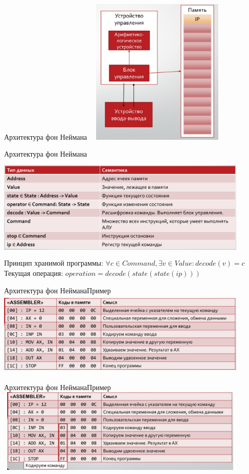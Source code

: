 \documentclass[10pt]{beamer}
\begin{document}
\begin{frame}[fragile]{Архитектура фон Неймана}
\includegraphics[width=7cm, height=7cm]{Term_1/Source/Pirctures/fon.jpg}
\end{frame}

\begin{frame}[fragile]{Архитектура фон Неймана}
\includegraphics[width=12cm, height=5cm]{Term_1/Source/Pirctures/math-fon.jpg}\\
Принцип хранимой программы: $\forall c \in Command, \exists v \in Value : decode(v) = c $
Текущая операция: $operation = decode(state(state(ip)))$
\end{frame}


\begin{frame}[fragile]{Архитектура фон Неймана}{Пример}
\includegraphics[width=12cm, height=4cm]{Term_1/Source/Pirctures/example.jpg}
\end{frame}

\begin{frame}[fragile]{Архитектура фон Неймана}{Пример}
\includegraphics[width=12cm, height=4cm]{Term_1/Source/Pirctures/example1.jpg}
\end{frame}
\end{document}

